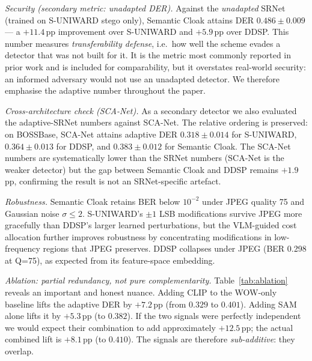\documentclass[10pt,a4paper]{article}
\begin{document}
\emph{Security (secondary metric: unadapted DER).} Against the
\emph{unadapted} SRNet (trained on S-UNIWARD stego only), Semantic
Cloak attains DER $0.486 \pm 0.009$ --- a $+11.4$\,pp improvement over
S-UNIWARD and $+5.9$\,pp over DDSP. This number measures
\emph{transferability defense}, i.e.\ how well the scheme evades a
detector that was not built for it. It is the metric most commonly
reported in prior work and is included for comparability, but it
overstates real-world security: an informed adversary would not use
an unadapted detector. We therefore emphasise the adaptive number
throughout the paper.

\emph{Cross-architecture check (SCA-Net).} As a secondary detector we
also evaluated the adaptive-SRNet numbers against SCA-Net. The
relative ordering is preserved: on BOSSBase, SCA-Net attains adaptive
DER $0.318 \pm 0.014$ for S-UNIWARD, $0.364 \pm 0.013$ for DDSP, and
$0.383 \pm 0.012$ for Semantic Cloak. The SCA-Net numbers are
systematically lower than the SRNet numbers (SCA-Net is the weaker
detector) but the gap between Semantic Cloak and DDSP remains
$+1.9$\,pp, confirming the result is not an SRNet-specific artefact.

\emph{Robustness.} Semantic Cloak retains BER below $10^{-2}$ under
JPEG quality 75 and Gaussian noise $\sigma \leq 2$. S-UNIWARD's
$\pm 1$ LSB modifications survive JPEG more gracefully than DDSP's
larger learned perturbations, but the VLM-guided cost allocation
further improves robustness by concentrating modifications in
low-frequency regions that JPEG preserves. DDSP collapses under JPEG
(BER 0.298 at Q=75), as expected from its feature-space embedding.

\emph{Ablation: partial redundancy, not pure complementarity.}
Table~\ref{tab:ablation} reveals an important and honest nuance.
Adding CLIP to the WOW-only baseline lifts the adaptive DER by
$+7.2$\,pp (from $0.329$ to $0.401$). Adding SAM alone lifts it by
$+5.3$\,pp (to $0.382$). If the two signals were perfectly independent
we would expect their combination to add approximately
$+12.5$\,pp; the actual combined lift is $+8.1$\,pp (to $0.410$). The
signals are therefore \emph{sub-additive}: they overlap.
\end{document}
